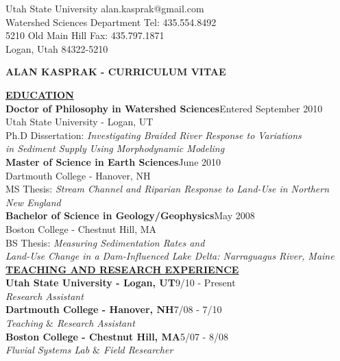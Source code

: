 \documentclass{article}
\begin{document}
\singlespacing
\vspace{0.2cm}
\noindent Utah State University \hfill{} alan.kasprak@gmail.com\\
Watershed Sciences Department \hfill{} Tel:  435.554.8492\\
5210 Old Main Hill \hfill{} Fax: 435.797.1871\\
Logan, Utah 84322-5210

\begin{center}
	\textbf{ALAN KASPRAK - CURRICULUM VITAE}
\end{center}

\noindent \textbf{\underline{EDUCATION}}\\
\noindent \textbf{Doctor of Philosophy in Watershed Sciences}\hfill{}Entered September 2010\\
Utah State University - Logan, UT\\
Ph.D Dissertation: \textit{Investigating Braided River Response to Variations\\
in Sediment Supply Using Morphodynamic Modeling}\\

\noindent \textbf{Master of Science in Earth Sciences}\hfill{}June 2010\\
Dartmouth College - Hanover, NH\\
MS Thesis: \textit{Stream Channel and Riparian Response to Land-Use in Northern\\
New England}\\

\noindent \textbf{Bachelor of Science in Geology/Geophysics}\hfill{}May 2008\\
Boston College - Chestnut Hill, MA\\
BS Thesis: \textit{Measuring Sedimentation Rates and\\
Land-Use Change in a Dam-Influenced Lake Delta: Narraguagus River, Maine}\\

\noindent \textbf{\underline{TEACHING AND RESEARCH EXPERIENCE}}\\
\textbf{Utah State University - Logan, UT}\hfill{}9/10 - Present\\
\textit{Research Assistant}\\

\noindent \textbf{Dartmouth College - Hanover, NH}\hfill{}7/08 - 7/10\\
\textit{Teaching $\&$ Research Assistant}\\

\noindent \textbf{Boston College - Chestnut Hill, MA}\hfill{}5/07 - 8/08\\
\textit{Fluvial Systems Lab $\&$ Field Researcher}\\
\end{document}
